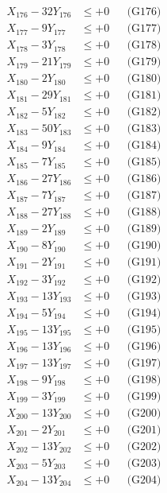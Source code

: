 \documentclass[a4paper,10pt]{article}
\begin{document}
{\begin{align}
X_{176} - 32Y_{176} &\leq +0 && \text{(G176)} \\
X_{177} - 9Y_{177} &\leq +0 && \text{(G177)} \\
\allowbreak
X_{178} - 3Y_{178} &\leq +0 && \text{(G178)} \\
X_{179} - 21Y_{179} &\leq +0 && \text{(G179)} \\
X_{180} - 2Y_{180} &\leq +0 && \text{(G180)} \\
X_{181} - 29Y_{181} &\leq +0 && \text{(G181)} \\
X_{182} - 5Y_{182} &\leq +0 && \text{(G182)} \\
X_{183} - 50Y_{183} &\leq +0 && \text{(G183)} \\
X_{184} - 9Y_{184} &\leq +0 && \text{(G184)} \\
X_{185} - 7Y_{185} &\leq +0 && \text{(G185)} \\
X_{186} - 27Y_{186} &\leq +0 && \text{(G186)} \\
X_{187} - 7Y_{187} &\leq +0 && \text{(G187)} \\
\allowbreak
X_{188} - 27Y_{188} &\leq +0 && \text{(G188)} \\
X_{189} - 2Y_{189} &\leq +0 && \text{(G189)} \\
X_{190} - 8Y_{190} &\leq +0 && \text{(G190)} \\
X_{191} - 2Y_{191} &\leq +0 && \text{(G191)} \\
X_{192} - 3Y_{192} &\leq +0 && \text{(G192)} \\
X_{193} - 13Y_{193} &\leq +0 && \text{(G193)} \\
X_{194} - 5Y_{194} &\leq +0 && \text{(G194)} \\
X_{195} - 13Y_{195} &\leq +0 && \text{(G195)} \\
X_{196} - 13Y_{196} &\leq +0 && \text{(G196)} \\
X_{197} - 13Y_{197} &\leq +0 && \text{(G197)} \\
\allowbreak
X_{198} - 9Y_{198} &\leq +0 && \text{(G198)} \\
X_{199} - 3Y_{199} &\leq +0 && \text{(G199)} \\
X_{200} - 13Y_{200} &\leq +0 && \text{(G200)} \\
X_{201} - 2Y_{201} &\leq +0 && \text{(G201)} \\
X_{202} - 13Y_{202} &\leq +0 && \text{(G202)} \\
X_{203} - 5Y_{203} &\leq +0 && \text{(G203)} \\
X_{204} - 13Y_{204} &\leq +0 && \text{(G204)} \\

\end{align}}
\end{document}
